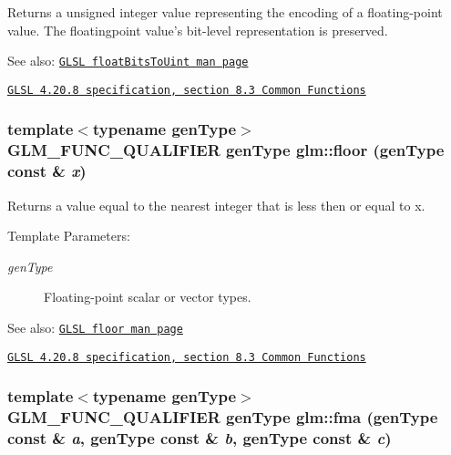 Returns a unsigned integer value representing the encoding of a floating-point value. The floatingpoint value's bit-level representation is preserved.

\begin{Desc}
\item[See also:]\href{http://www.opengl.org/sdk/docs/manglsl/xhtml/floatBitsToUint.xml}{\tt GLSL floatBitsToUint man page} 

\href{http://www.opengl.org/registry/doc/GLSLangSpec.4.20.8.pdf}{\tt GLSL 4.20.8 specification, section 8.3 Common Functions} \end{Desc}
\hypertarget{group__core__func__common_gf87c2d5cbed8b293dcb7506b7c06c9e1}{
\subsubsection[floor]{\setlength{\rightskip}{0pt plus 5cm}template$<$typename genType$>$ GLM\_\-FUNC\_\-QUALIFIER genType glm::floor (genType const \& {\em x})}}
\label{group__core__func__common_gf87c2d5cbed8b293dcb7506b7c06c9e1}


Returns a value equal to the nearest integer that is less then or equal to x.

\begin{Desc}
\item[Template Parameters:]
\begin{description}
\item[{\em genType}]Floating-point scalar or vector types.\end{description}
\end{Desc}
\begin{Desc}
\item[See also:]\href{http://www.opengl.org/sdk/docs/manglsl/xhtml/floor.xml}{\tt GLSL floor man page} 

\href{http://www.opengl.org/registry/doc/GLSLangSpec.4.20.8.pdf}{\tt GLSL 4.20.8 specification, section 8.3 Common Functions} \end{Desc}
\hypertarget{group__core__func__common_ga9d229fca69599e027dd6a097938367b}{
\subsubsection[fma]{\setlength{\rightskip}{0pt plus 5cm}template$<$typename genType$>$ GLM\_\-FUNC\_\-QUALIFIER genType glm::fma (genType const \& {\em a}, \/  genType const \& {\em b}, \/  genType const \& {\em c})}}
\label{group__core__func__common_ga9d229fca69599e027dd6a097938367b}


